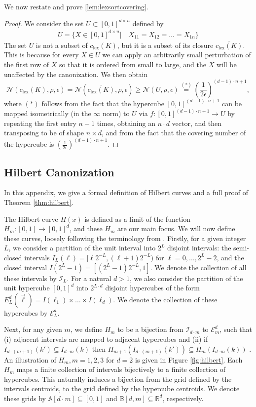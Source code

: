 \documentclass{article}
\theoremstyle{definition}
\theoremstyle{plain}
\newcommand{\N}{\mathcal{N}}
\newcommand{\RR}{\mathbb{R}}
\newcommand{\csort}{c_{\mathrm{lex}}}
\begin{document}
We now restate and prove \ref{lem:lexsortcovering}.
\lexsortcovering*
\begin{proof}
    \label{lexsortcovering}
    We consider the set $U \subset [0,1]^{ d \times n}$ defined by 
\begin{align*}
    U= \{X\in [0,1]^{d\times n}| \quad X_{11}=X_{12}=\ldots=X_{1n}\}
\end{align*}
The set $U$ is not a subset of $\csort(K)$, but it is a subset of its closure $\overline{\csort(K)}$. This is because for every  $X \in U$ we can apply an arbitrarily small perturbation of the first row of $X$ so that it is ordered from small to large, and the $X$ will be unaffected by the canonization. We then obtain
$$ \N(\csort(K),\rho,\epsilon)=\N(\overline{\csort(K)},\rho,\epsilon)\geq \N(U,\rho,\epsilon)\stackrel{(*)}{=}\left(\frac{1}{2\epsilon}\right)^{(d-1)\cdot n + 1},$$
where $(*)$ follows from the fact that the hypercube $[0,1]^{(d-1)\cdot n + 1} $ can be mapped isometrically (in the $\infty$ norm) to $U$ via $f:[0,1]^{(d-1)\cdot n + 1} \rightarrow U$ by repeating the first entry $n-1$ times, obtaining an $n \cdot d$ vector, and then transposing to be of shape $n \times d$, and from the fact that the covering number of the hypercube is  
$\left(\frac{1}{2\epsilon}\right)^{(d-1)\cdot n +1}$.
\end{proof}
\subsection{Hilbert Canonization}\label{app:hilbert}
In this appendix, we give a formal definition of Hilbert curves and a full proof of Theorem \ref {thm:hilbert}.

The Hilbert curve $H(x)$ is defined as a limit of the function $H_m:[0,1]\to [0,1]^d$, and these $H_m$ are our main focus. We will now define these curves, loosely following the terminology from 
\cite{Hilbert}. Firstly, for a given integer $L $, we consider a partition of the unit interval into $2^L$ disjoint intervals: the semi-closed intervals $I_L(\ell)=[\ell 2^{-L}, (\ell+1)2^{-L})$ for $\ell=0,\ldots,2^{L}-2$, and the closed interval $I(2^L-1)=[(2^L-1)2^{-L},1] $. We denote the collection of all these intervals by $\mathcal{I}_L $. For a natural $d>1$, we also consider the partition of the unit hypercube $[0,1]^d$ into $2^{L\cdot d} $ disjoint hypercubes of the form 
$E_L^d(\vec \ell)=I(\ell_1)\times \ldots \times I(\ell_d)$. We denote the collection of these hypercubes by $\mathcal{E}_L^d $. 

Next, for any given $m$, we define  $H_m$ to be a  bijection from $\mathcal{I}_{d\cdot m} $ to $\mathcal{E}_{m}^d $, such that (i) adjacent intervals are mapped to adjacent hypercubes and (ii) if $I_{d\cdot (m+1)}(k')\subseteq I_{d\cdot m}(k) $ then 
$H_{m+1}\left(I_{d\cdot (m+1)}(k')\right)\subseteq H_m\left(I_{d\cdot m}(k) \right) $ . An illustration of $H_m, m=1,2,3$ for $d=2$ is given in Figure \ref{fig:hilbert}. Each $H_m$ maps a finite collection of intervals bijectively to a finite collection of hypercubes. This naturally induces a bijection from the grid defined by the intervals centroids, to the grid defined by the hypercube centroids. We denote these grids by $\mathbb{A}[d\cdot m]\subseteq [0,1] $ and $\mathbb{B}[d,m]\subseteq \RR^d $, respectively.
\end{document}
